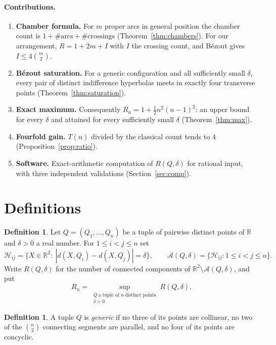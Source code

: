 ﻿\documentclass[11pt,a4paper]{article}
\theoremstyle{definition}
\newtheorem{definition}[theorem]{Definition}
\theoremstyle{remark}
\newcommand{\RR}{\mathbb{R}}
\newcommand{\HH}{\mathcal{H}}
\newcommand{\ARR}{\mathcal{A}}
\begin{document}
\paragraph{Contributions.}
\begin{enumerate}[leftmargin=*,itemsep=2pt]
\item \textbf{Chamber formula.}  For $m$ proper arcs in general position the
  chamber count is $1+\#\text{arcs}+\#\text{crossings}$ (Theorem~\ref{thm:chambers}).
  For our arrangement, $R=1+2m+I$ with $I$ the crossing count, and B\'ezout
  gives $I\le 4\binom m2$.
\item \textbf{B\'ezout saturation.}  For a generic configuration and all
  sufficiently small $\delta$, every pair of distinct indifference hyperbolas
  meets in exactly four transverse points (Theorem~\ref{thm:saturation}).
\item \textbf{Exact maximum.}  Consequently
  $R_n=1+\tfrac12 n^2(n-1)^2$: an upper bound for every $\delta$ and attained
  for every sufficiently small $\delta$ (Theorem~\ref{thm:max}).
\item \textbf{Fourfold gain.}  $T(n)$ divided by the classical count tends to
  $4$ (Proposition~\ref{prop:ratio}).
\item \textbf{Software.}  Exact-arithmetic computation of $R(Q,\delta)$ for
  rational input, with three independent validations (Section~\ref{sec:comp}).
\end{enumerate}

\section{Definitions}
\label{sec:defs}

\begin{definition}\label{def:main}
Let $Q=(Q_1,\dots,Q_n)$ be a tuple of pairwise distinct points of $\RR$ and
$\delta>0$ a real number.  For $1\le i<j\le n$ set
\[
\HH_{ij}=\{X\in\RR^2:\ |d(X,Q_i)-d(X,Q_j)|=\delta\},
\qquad
\ARR(Q,\delta)=\{\HH_{ij}:1\le i<j\le n\}.
\]
Write $R(Q,\delta)$ for the number of connected components of
$\RR^2\setminus\ARR(Q,\delta)$, and put
\[
R_n=\sup_{\substack{Q\ \text{a tuple of } n\ \text{distinct points}\\ \delta>0}}
R(Q,\delta).
\]
\end{definition}

\begin{definition}
A tuple $Q$ is \emph{generic} if no three of its points are collinear, no two of
the $\binom n2$ connecting segments are parallel, and no four of its points are
concyclic.
\end{definition}
\end{document}
